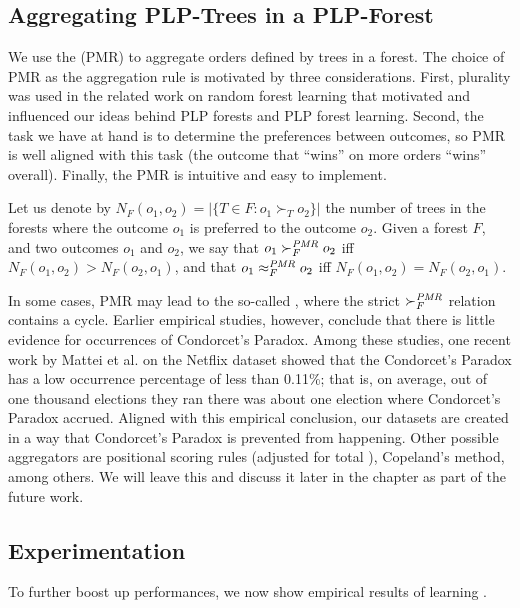 \subsection{Aggregating PLP-Trees in a PLP-Forest}
We use the  (PMR) to aggregate
orders defined by trees in a forest. 
The choice of PMR as the aggregation rule is motivated by three considerations.
First, plurality was used in the related
work on random forest learning that motivated and influenced our ideas behind
PLP forests and PLP forest learning. 
Second, the task we have at hand is to determine the preferences between
outcomes, so PMR is well aligned with this task (the outcome that ``wins''
on more orders ``wins'' overall). 
Finally, the PMR is intuitive and easy to implement.

Let us denote by $N_F(o_1,o_2)=|\{T \in F:o_1 \succ_T o_2\}|$
the number of trees in the forests where the outcome $o_1$ is
preferred to the outcome $o_2$.
Given a forest $F$, and two outcomes $o_1$ and $o_2$,
we say that $o_1 \succ_F^{\mathit{PMR}} o_2$ iff $N_F(o_1,o_2)>N_F(o_2,o_1)$,
and that $o_1 \approx_F^{\mathit{PMR}} o_2$ iff $N_F(o_1,o_2)=N_F(o_2,o_1)$.

In some cases, PMR may lead to the so-called 
, where the strict $\succ_F^{\mathit{PMR}}$ 
relation contains a cycle.
Earlier empirical studies, however, conclude that there is little evidence for
occurrences of Condorcet's Paradox.
Among these studies, one recent work by Mattei et al.
on the Netflix dataset showed that the Condorcet's Paradox
has a low occurrence percentage of less than 0.11\%\cite{mattei2012empirical}; 
that is, on average, out of one thousand elections they ran 
there was about one election where Condorcet's Paradox accrued.
Aligned with this empirical conclusion, our datasets are created 
in a way that Condorcet's Paradox is prevented from happening.
Other possible aggregators are positional
scoring rules (adjusted for total ), Copeland's
method, among others.
We will leave this and discuss it later in the chapter as part of 
the future work.


\subsection{Experimentation}
To further boost up performances, we now show empirical results
of learning .

